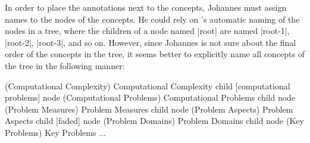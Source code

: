 In order to place the annotations next to the concepts, Johannes must assign
names to the nodes of the concepts. He could rely on \tikzname's automatic
naming of the nodes in a tree, where the children of a node named |root| are
named |root-1|, |root-2|, |root-3|, and so on. However, since Johannes is not
sure about the final order of the concepts in the tree, it seems better to
explicitly name all concepts of the tree in the following manner:
%
\begin{codeexample}
 (Computational Complexity) {Computational Complexity}
  child [computational problems] { node (Computational Problems) {Computational Problems}
    child         { node (Problem Measures) {Problem Measures} }
    child         { node (Problem Aspects) {Problem Aspects} }
    child [faded] { node (Problem Domains) {Problem Domains} }
    child         { node (Key Problems) {Key Problems} }
  }
...
\end{codeexample}

